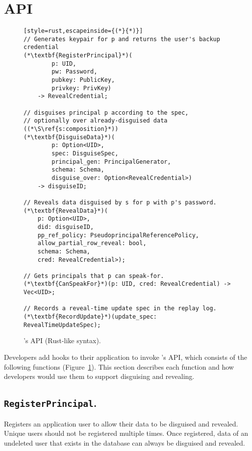 \section{\sys API}
\label{s:api}

\begin{figure}[t]
\begin{lstlisting}[style=rust,escapeinside={(*}{*)}]
// Generates keypair for p and returns the user's backup credential
(*\textbf{RegisterPrincipal}*)(
        p: UID, 
        pw: Password,
        pubkey: PublicKey, 
        privkey: PrivKey)
    -> RevealCredential;

// disguises principal p according to the spec, 
// optionally over already-disguised data ((*\S\ref{s:composition}*))
(*\textbf{DisguiseData}*)(
        p: Option<UID>, 
        spec: DisguiseSpec,
        principal_gen: PrincipalGenerator,
        schema: Schema,
        disguise_over: Option<RevealCredential>) 
    -> disguiseID;

// Reveals data disguised by s for p with p's password. 
(*\textbf{RevealData}*)(
    p: Option<UID>, 
    did: disguiseID, 
    pp_ref_policy: PseudoprincipalReferencePolicy,
    allow_partial_row_reveal: bool,
    schema: Schema,
    cred: RevealCredential>);

// Gets principals that p can speak-for.
(*\textbf{CanSpeakFor}*)(p: UID, cred: RevealCredential) -> Vec<UID>;

// Records a reveal-time update spec in the replay log.
(*\textbf{RecordUpdate}*)(update_spec: RevealTimeUpdateSpec);
\end{lstlisting}
\caption{\sys's API (Rust-like syntax).}
\label{f:api-high}
\end{figure}
%

Developers add hooks to their application to invoke \sys's API, which consists
of the following functions (Figure~\ref{f:api-high}). This section describes
each function and how developers would use them to support disguising and
revealing.

\subsection{\texttt{RegisterPrincipal}.}

    Registers an application user to allow their data to be disguised and
    revealed. Unique users should not be registered multiple times.  Once
    registered, data of an undeleted user that exists in the database can always
    be disguised and revealed.

